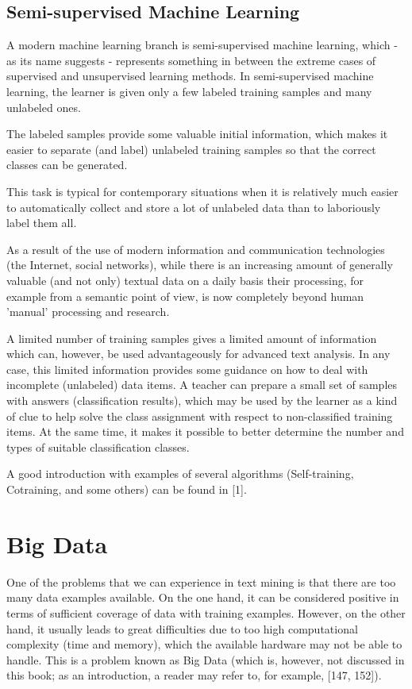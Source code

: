 \documentclass[11pt,openany,executivepaper]{book}
\begin{document}
\subsection{Semi-supervised Machine Learning}
A modern machine learning branch is semi-supervised machine learning, which - as its name suggests - represents something in between the extreme cases of supervised and unsupervised learning methods. In semi-supervised machine learning, the learner is given only a few labeled training samples and many unlabeled ones.

The labeled samples provide some valuable initial information, which makes it easier to separate (and label) unlabeled training samples so that the correct classes can be generated.

This task is typical for contemporary situations when it is relatively much easier to automatically collect and store a lot of unlabeled data than to laboriously label them all.

As a result of the use of modern information and communication technologies (the Internet, social networks), while there is an increasing amount of generally valuable (and not only) textual data on a daily basis their processing, for example from a semantic point of view, is now completely beyond human 'manual' processing and research.

A limited number of training samples gives a limited amount of information which can, however, be used advantageously for advanced text analysis. In any case, this limited information provides some guidance on how to deal with incomplete (unlabeled) data items. A teacher can prepare a small set of samples with answers (classification results), which may be used by the learner as a kind of clue to help solve the class assignment with respect to non-classified training items. At the same time, it makes it possible to better determine the number and types of suitable classification classes.

A good introduction with examples of several algorithms (Self-training, Cotraining, and some others) can be found in [1].

\section{Big Data}
One of the problems that we can experience in text mining is that there are too many data examples available. On the one hand, it can be considered positive in terms of sufficient coverage of data with training examples. However, on the other hand, it usually leads to great difficulties due to too high computational complexity (time and memory), which the available hardware may not be able to handle. This is a problem known as Big Data (which is, however, not discussed in this book; as an introduction, a reader may refer to, for example, [147, 152]).
\end{document}
